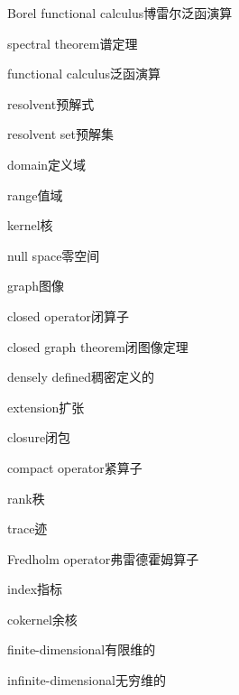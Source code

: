 \begin{multicols}{2}
Borel functional calculus\hspace{0.9em}博雷尔泛函演算\par
spectral theorem\hspace{0.9em}谱定理\par
functional calculus\hspace{0.9em}泛函演算\par
resolvent\hspace{0.9em}预解式\par
resolvent set\hspace{0.9em}预解集\par
domain\hspace{0.9em}定义域\par
range\hspace{0.9em}值域\par
kernel\hspace{0.9em}核\par
null space\hspace{0.9em}零空间\par
graph\hspace{0.9em}图像\par
closed operator\hspace{0.9em}闭算子\par
closed graph theorem\hspace{0.9em}闭图像定理\par
densely defined\hspace{0.9em}稠密定义的\par
extension\hspace{0.9em}扩张\par
closure\hspace{0.9em}闭包\par
compact operator\hspace{0.9em}紧算子\par
rank\hspace{0.9em}秩\par
trace\hspace{0.9em}迹\par
Fredholm operator\hspace{0.9em}弗雷德霍姆算子\par
index\hspace{0.9em}指标\par
cokernel\hspace{0.9em}余核\par
finite-dimensional\hspace{0.9em}有限维的\par
infinite-dimensional\hspace{0.9em}无穷维的\par

\end{multicols}
